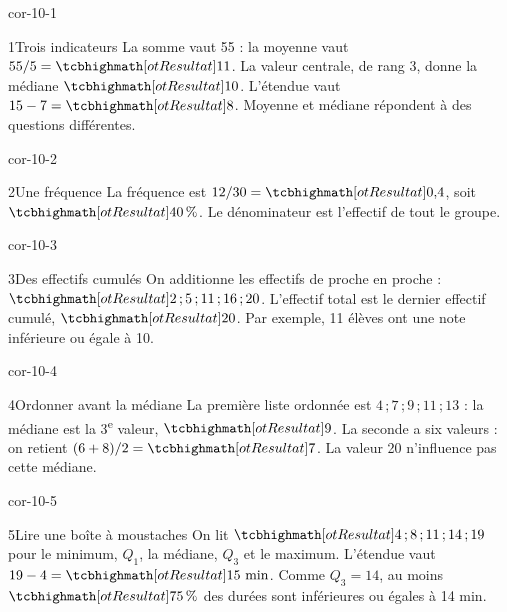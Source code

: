 \clearpage\pagestyle{otMain}\fontsize{11}{15}\selectfont{}
\begin{blocLivre}{cor-10-1}\begin{corrige}{1}{Trois indicateurs}
La somme vaut 55 : la moyenne vaut $55/5=\res{11}$. La valeur centrale, de rang 3, donne la médiane $\res{10}$. L’étendue vaut $15-7=\res8$. Moyenne et médiane répondent à des questions différentes.
\end{corrige}\end{blocLivre}
\begin{blocLivre}{cor-10-2}\begin{corrige}{2}{Une fréquence}
La fréquence est $12/30=\res{0{,}4}$, soit $\res{40\,\%}$. Le dénominateur est l’effectif de tout le groupe.
\end{corrige}\end{blocLivre}
\begin{blocLivre}{cor-10-3}\begin{corrige}{3}{Des effectifs cumulés}
On additionne les effectifs de proche en proche : $\res{2\,;5\,;11\,;16\,;20}$. L’effectif total est le dernier effectif cumulé, $\res{20}$. Par exemple, 11 élèves ont une note inférieure ou égale à 10.
\end{corrige}\end{blocLivre}
\begin{blocLivre}{cor-10-4}\begin{corrige}{4}{Ordonner avant la médiane}
La première liste ordonnée est $4\,;7\,;9\,;11\,;13$ : la médiane est la 3\textsuperscript{e} valeur, $\res9$. La seconde a six valeurs : on retient $(6+8)/2=\res7$. La valeur 20 n’influence pas cette médiane.
\end{corrige}\end{blocLivre}
\begin{blocLivre}{cor-10-5}\begin{corrige}{5}{Lire une boîte à moustaches}
On lit $\res{4\,;8\,;11\,;14\,;19}$ pour le minimum, $Q_1$, la médiane, $Q_3$ et le maximum. L’étendue vaut $19-4=\res{15\text{ min}}$. Comme $Q_3=14$, au moins $\res{75\,\%}$ des durées sont inférieures ou égales à 14 min.
\label{fig-cor-10-5}
\end{corrige}\end{blocLivre}
